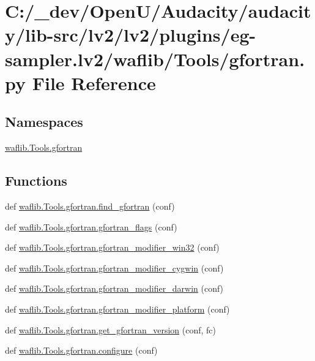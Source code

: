 \hypertarget{lv2_2plugins_2eg-sampler_8lv2_2waflib_2_tools_2gfortran_8py}{}\section{C\+:/\+\_\+dev/\+Open\+U/\+Audacity/audacity/lib-\/src/lv2/lv2/plugins/eg-\/sampler.lv2/waflib/\+Tools/gfortran.py File Reference}
\label{lv2_2plugins_2eg-sampler_8lv2_2waflib_2_tools_2gfortran_8py}
\subsection*{Namespaces}
\begin{DoxyCompactItemize}
\item 
 \hyperlink{namespacewaflib_1_1_tools_1_1gfortran}{waflib.\+Tools.\+gfortran}
\end{DoxyCompactItemize}
\subsection*{Functions}
\begin{DoxyCompactItemize}
\item 
def \hyperlink{namespacewaflib_1_1_tools_1_1gfortran_a831f2f61b251e9981867542649f2339d}{waflib.\+Tools.\+gfortran.\+find\+\_\+gfortran} (conf)
\item 
def \hyperlink{namespacewaflib_1_1_tools_1_1gfortran_a08762d92086757a2af5414ff6aef84e9}{waflib.\+Tools.\+gfortran.\+gfortran\+\_\+flags} (conf)
\item 
def \hyperlink{namespacewaflib_1_1_tools_1_1gfortran_ad22cc6d0d2b302315d031dcb2c035c49}{waflib.\+Tools.\+gfortran.\+gfortran\+\_\+modifier\+\_\+win32} (conf)
\item 
def \hyperlink{namespacewaflib_1_1_tools_1_1gfortran_abf2215270c976ac6aa31055132d201a6}{waflib.\+Tools.\+gfortran.\+gfortran\+\_\+modifier\+\_\+cygwin} (conf)
\item 
def \hyperlink{namespacewaflib_1_1_tools_1_1gfortran_a3124f50b1bc53ecd3fafbcf79f296414}{waflib.\+Tools.\+gfortran.\+gfortran\+\_\+modifier\+\_\+darwin} (conf)
\item 
def \hyperlink{namespacewaflib_1_1_tools_1_1gfortran_af3b109053ce35738f8f717bbd9eb4076}{waflib.\+Tools.\+gfortran.\+gfortran\+\_\+modifier\+\_\+platform} (conf)
\item 
def \hyperlink{namespacewaflib_1_1_tools_1_1gfortran_a9d31db08b155f317bf0b19a8c1f72b57}{waflib.\+Tools.\+gfortran.\+get\+\_\+gfortran\+\_\+version} (conf, fc)
\item 
def \hyperlink{namespacewaflib_1_1_tools_1_1gfortran_acd792ef8a96cbe13a82a54ce98896db5}{waflib.\+Tools.\+gfortran.\+configure} (conf)
\end{DoxyCompactItemize}
